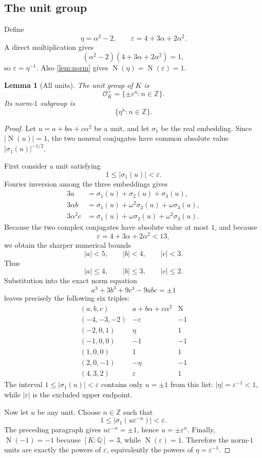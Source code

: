 \documentclass[11pt,a4paper]{article}
\newtheorem{lemma}[lemma]{Lemma}
\newcommand{\Z}{\mathbb Z}
\newcommand{\Q}{\mathbb Q}
\newcommand{\OK}{\mathcal O_K}
\newcommand{\Norm}{\operatorname{N}}
\newcommand{\eps}{\varepsilon}
\newcommand{\etaunit}{\eta}
\begin{document}
\subsection{The unit group}

Define
\[
\etaunit=\alpha^2-2,
\qquad
\eps=4+3\alpha+2\alpha^2.
\]
A direct multiplication gives
\[
(\alpha^2-2)(4+3\alpha+2\alpha^2)=1,
\]
so $\eps=\etaunit^{-1}$.  Also \cref{lem:norm} gives
$\Norm(\etaunit)=\Norm(\eps)=1$.

\begin{lemma}[All units]\label{lem:units}
The unit group of $K$ is
\[
\OK^\times=\{\pm\eps^n:n\in\Z\}.
\]
Its norm-$1$ subgroup is
\[
\{\etaunit^n:n\in\Z\}.
\]
\end{lemma}

\begin{proof}
Let $u=a+b\alpha+c\alpha^2$ be a unit, and let $\sigma_1$ be the real
embedding.  Since $|\Norm(u)|=1$, the two nonreal conjugates have common
absolute value $|\sigma_1(u)|^{-1/2}$.

First consider a unit satisfying
\[
1\le |\sigma_1(u)|<\eps.
\]
Fourier inversion among the three embeddings gives
\[
\begin{aligned}
3a&=\sigma_1(u)+\sigma_2(u)+\sigma_3(u),\\
3\alpha b&=\sigma_1(u)+\omega^2\sigma_2(u)+\omega\sigma_3(u),\\
3\alpha^2 c&=\sigma_1(u)+\omega\sigma_2(u)+\omega^2\sigma_3(u).
\end{aligned}
\]
Because the two complex conjugates have absolute value at most $1$, and
because
\[
\eps=4+3\alpha+2\alpha^2<13,
\]
we obtain the sharper numerical bounds
\[
|a|<5,
\qquad
|b|<4,
\qquad
|c|<3.
\]
Thus
\[
|a|\le4,
\qquad
|b|\le3,
\qquad
|c|\le2.
\]
Substitution into the exact norm equation
\[
a^3+3b^3+9c^3-9abc=\pm1
\]
leaves precisely the following six triples:
\[
\begin{array}{c|c|c}
(a,b,c)&a+b\alpha+c\alpha^2&\Norm\\ \hline
(-4,-3,-2)&-\eps&-1\\
(-2,0,1)&\etaunit&1\\
(-1,0,0)&-1&-1\\
(1,0,0)&1&1\\
(2,0,-1)&-\etaunit&-1\\
(4,3,2)&\eps&1
\end{array}
\]
The interval $1\le|\sigma_1(u)|<\eps$ contains only $u=\pm1$ from this
list: $|\etaunit|=\eps^{-1}<1$, while $|\eps|$ is the excluded upper
endpoint.

Now let $u$ be any unit.  Choose $n\in\Z$ such that
\[
1\le|\sigma_1(u\eps^{-n})|<\eps.
\]
The preceding paragraph gives $u\eps^{-n}=\pm1$, hence
$u=\pm\eps^n$.  Finally, $\Norm(-1)=-1$ because $[K:\Q]=3$, while
$\Norm(\eps)=1$.  Therefore the norm-$1$ units are exactly the powers of
$\eps$, equivalently the powers of $\etaunit=\eps^{-1}$.
\end{proof}
\end{document}
